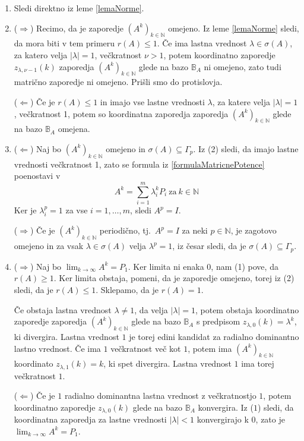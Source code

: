 \documentclass[mat1]{fmfdelo}
\newcommand{\N}{\mathbb N}
\begin{document}
\begin{dokaz}
    \leavevmode
    \begin{enumerate}
        \item Sledi direktno iz leme \ref{lemaNorme}.
        \item ($\Rightarrow$) Recimo, da je zaporedje $(A^k)_{k\in\N}$ omejeno. Iz leme \ref{lemaNorme} sledi, da mora biti v tem primeru $r(A) \leq 1$. Če ima lastna vrednost $\lambda \in \sigma(A)$, za katero velja $|\lambda| = 1$, večkratnost $\nu > 1$, potem koordinatno zaporedje $z_{\lambda, \nu - 1}(k)$ zaporedja $(A^k)_{k\in\N}$ glede na bazo $\mathbb{B}_A$ ni omejeno, zato tudi matrično zaporedje ni omejeno. Prišli smo do protislovja.
        
        \noindent($\Leftarrow$) Če je $r(A) \leq 1$ in imajo vse lastne vrednosti $\lambda$, za katere velja $|\lambda| = 1$, večkratnost 1, potem so koordinatna zaporedja zaporedja $(A^k)_{k\in\N}$ glede na bazo $\mathbb{B}_A$ omejena.
        \item ($\Leftarrow$) Naj bo $(A^k)_{k\in\N}$ omejeno in $\sigma(A) \subseteq \Gamma_p$. Iz (2) sledi, da imajo lastne vrednosti večkratnost 1, zato se formula iz \eqref{formulaMatricnePotence} poenostavi v
        \begin{equation*}
            A^k = \sum_{i=1}^m \lambda_i^k P_i\ \text{za}\ k\in\N
        \end{equation*}
        Ker je $\lambda_i^p=1$ za vse $i=1,\ldots,m$, sledi $A^p = I$.

        \noindent($\Rightarrow$) Če je $(A^k)_{k\in\N}$ periodično, tj.\ $A^p = I$ za neki $p\in\N$, je zagotovo omejeno in za vsak $\lambda\in\sigma(A)$ velja $\lambda^p = 1$, iz česar sledi, da je $\sigma(A) \subseteq \Gamma_p$.
        \item ($\Rightarrow$) Naj bo $\lim_{k\rightarrow\infty} A^k = P_1$. Ker limita ni enaka 0, nam (1) pove, da $r(A) \geq 1$. Ker limita obstaja, pomeni, da je zaporedje omejeno, torej iz (2) sledi, da je $r(A) \leq 1$. Sklepamo, da je $r(A) = 1$.
        
        Če obstaja lastna vrednost $\lambda \neq 1$, da velja $|\lambda| = 1$, potem obstaja koordinatno zaporedje zaporedja $(A^k)_{k\in\N}$ glede na bazo $\mathbb{B}_A$ s predpisom $z_{\lambda,0}(k) = \lambda^k$, ki divergira. Lastna vrednost $1$ je torej edini kandidat za radialno dominantno lastno vrednost. Če ima $1$ večkratnost več kot $1$, potem ima $(A^k)_{k\in\N}$ koordinato $z_{\lambda,1}(k) = k$, ki spet divergira. Lastna vrednost $1$ ima torej večkratnost $1$.

        \noindent($\Leftarrow$) Če je $1$ radialno dominantna lastna vrednost z večkratnostjo $1$, potem koordinatno zaporedje $z_{\lambda,0}(k)$ glede na bazo $\mathbb{B}_A$ konvergira. Iz ($1$) sledi, da koordinatna zaporedja za lastne vrednosti $|\lambda| < 1$ konvergirajo k 0, zato je $\lim_{k\rightarrow\infty} A^k = P_1$.
    \end{enumerate}
\end{dokaz}
\end{document}
